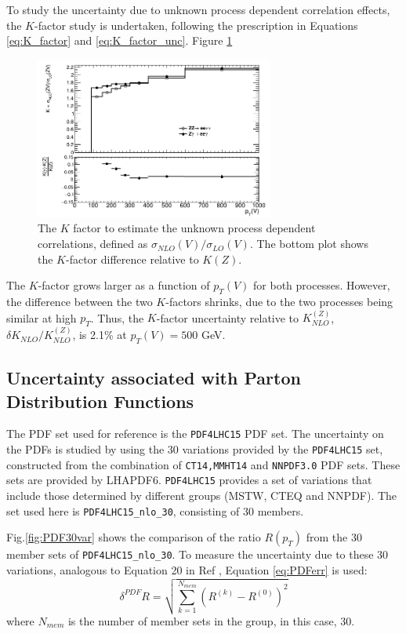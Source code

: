 \documentclass[11pt,a4paper,openright,twoside]{report}
\begin{document}
To study the uncertainty due to unknown process dependent correlation effects, the $K$-factor study is undertaken, following the prescription in Equations \ref{eq:K_factor} and \ref{eq:K_factor_unc}. Figure \ref{fig:K_pt}
\begin{figure}[H]
\centering
	\includegraphics[width=0.7\textwidth]{K_pt.png}
	\caption{The $K$ factor to estimate the unknown process dependent correlations, defined as $\sigma_{NLO}(V)/\sigma_{LO}(V)$. The bottom plot shows the $K$-factor difference relative to $K(Z)$.}
	\label{fig:K_pt}
\end{figure}
The $K$-factor grows larger as a function of $p_T(V)$ for both processes. However, the difference between the two $K$-factors shrinks, due to the two processes being similar at high $p_T$. Thus, the $K$-factor uncertainty relative to $K^{(Z)}_{NLO}$, $\delta K_{NLO}/K^{(Z)}_{NLO}$, is 2.1\% at $p_T(V) = 500$ GeV.
\vfill

\subsection{Uncertainty associated with Parton Distribution Functions}
The PDF set used for reference is the \texttt{PDF4LHC15}\cite{PDF4} PDF set. The uncertainty on the PDFs is studied by using the 30 variations provided by the \texttt{PDF4LHC15} set\cite{PDF4}, constructed from the combination of \texttt{CT14,MMHT14} and \texttt{NNPDF3.0} PDF sets. These sets are provided by LHAPDF6\cite{LHAPDF}. \texttt{PDF4LHC15} provides a set of variations that include those determined by different groups (MSTW, CTEQ and NNPDF). The set used here is \texttt{PDF4LHC15\_nlo\_30}, consisting of 30 members.

Fig.\ref{fig:PDF30var} shows the comparison of the ratio $R(p_T)$ from the 30 member sets of \texttt{PDF4LHC15\_nlo\_30}. To measure the uncertainty due to these 30 variations, analogous to Equation 20 in Ref \cite{PDF4}, Equation \ref{eq:PDFerr} is used:
\begin{equation}\label{eq:PDFerr}
	\delta^{PDF}R = \sqrt{\sum^{N_{mem}}_{k=1} (R^{(k)} - R^{(0)})^2}
\end{equation}
where $N_{mem}$ is the number of member sets in the group, in this case, 30.
\end{document}
